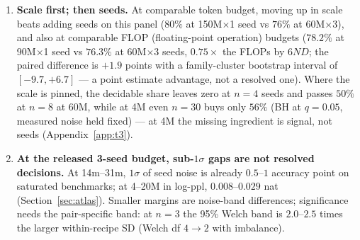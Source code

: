 \begin{enumerate}[leftmargin=1.6em,itemsep=1pt,topsep=2pt]
(exceptions: $1.3\%$ at 6M under BH, one pair at 16M under max-$T$; pooling the variances lifts 60M to $34\%$/$19\%$ under BH/BY) ---
below 60M the supported output is abstention, which avoids the 4M failure case outright
(the 4M argmax pick forfeits $5.9$ macro points at 1B). Abstention serves certified-difference
deliverables; when the deliverable is a pick it is a cost, not a benefit --- 60M's raw
ranking reads $76.3\%$ pairwise with a $1.9$-point top-1 loss, better than 150M's $4.7$
(Tables~\ref{tab:t3}~and~\ref{tab:regret}); at ${\ge}90$M it is
rule-dependent ($37$--$62\%$ under BH, $1$--$16\%$ dependence-robust; variance model matters
more than the rule at the boundary --- Table~\ref{tab:decidable}). The share is
\emph{target-free} (resolvability, not correctness; Section~\ref{sec:t3-inversion}), and the per-task SNR behind it predicts pairwise accuracy (Spearman $+0.89$ pooled, $+0.39$ within 4M; SNR $0.5$--$1 \to 63\%$ accuracy,
$88$--$93\%$ at ${\ge}2.5$; Appendix~\ref{app:t3}, Table~\ref{tab:snr-acc-bins}).
\item \textbf{Scale first; then seeds.} At comparable token budget,
moving up in scale beats adding seeds on this panel ($80\%$ at 150M$\times$1 seed vs $76\%$
at 60M$\times$3), and also at comparable FLOP (floating-point operation) budgets ($78.2\%$ at 90M$\times$1 seed vs $76.3\%$ at 60M$\times$3 seeds, $0.75\times$ the FLOPs by $6ND$; the paired difference is $+1.9$ points with a family-cluster bootstrap interval of $[-9.7, +6.7]$ --- a point estimate advantage, not a resolved one). Where the scale is
pinned, the decidable share leaves zero at $n{=}4$ seeds and passes $50\%$ at $n{=}8$ at
60M, while at 4M even $n{=}30$ buys only $56\%$ (BH at $q{=}0.05$, measured noise held fixed) --- at 4M the missing ingredient is signal,
not seeds (Appendix~\ref{app:t3}).
\item \textbf{At the released 3-seed budget, sub-$1\sigma$ gaps are not resolved decisions.}
At 14m--31m, $1\sigma$ of seed noise is already $0.5$--$1$ accuracy point on saturated
benchmarks; at 4--20M in log-ppl, $0.008$--$0.029$ nat
(Section~\ref{sec:atlas}). Smaller margins are noise-band differences; significance needs the pair-specific band: at $n = 3$ the 95\%
Welch band is $2.0$--$2.5$ times the larger within-recipe SD
(Welch df $4 \to 2$ with imbalance).
\end{enumerate}

